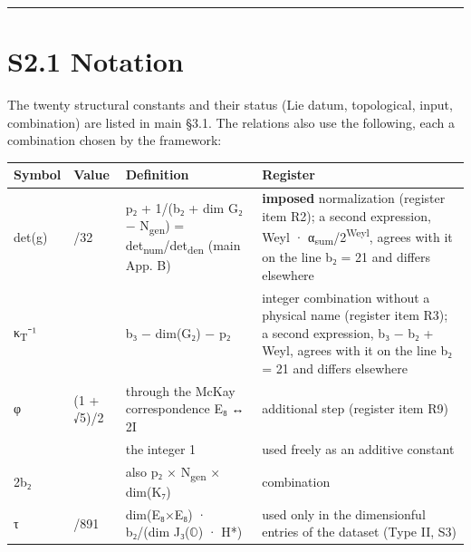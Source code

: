 \documentclass[11pt,a4paper]{article}
\begin{document}
\begin{center}\rule{\linewidth}{0.5pt}\end{center}

\section{S2.1 Notation}\label{s2.1-notation}

The twenty structural constants and their status (Lie datum, topological, input, combination) are listed in main §3.1. The relations also use the following, each a combination chosen by the framework:

\begin{longtable}[]{@{}
  >{\raggedright\arraybackslash}p{}
  >{\raggedright\arraybackslash}p{}
  >{\raggedright\arraybackslash}p{}
  >{\raggedright\arraybackslash}p{}@{}}
\toprule\noalign{}
\begin{minipage}[b]{\linewidth}\raggedright
Symbol
\end{minipage} & \begin{minipage}[b]{\linewidth}\raggedright
Value
\end{minipage} & \begin{minipage}[b]{\linewidth}\raggedright
Definition
\end{minipage} & \begin{minipage}[b]{\linewidth}\raggedright
Register
\end{minipage} \\
\midrule\noalign{}
\endhead
\bottomrule\noalign{}
\endlastfoot
det(g) & 65/32 & p₂ + 1/(b₂ + dim G₂ − N\textsubscript{gen}) = det\textsubscript{num}/det\textsubscript{den} (main App. B) & \textbf{imposed} normalization (register item R2); a second expression, Weyl · α\textsubscript{sum}/2\textsuperscript{Weyl}, agrees with it on the line b₂ = 21 and differs elsewhere \\
κ\textsubscript{T}⁻¹ & 61 & b₃ − dim(G₂) − p₂ & integer combination without a physical name (register item R3); a second expression, b₃ − b₂ + Weyl, agrees with it on the line b₂ = 21 and differs elsewhere \\
φ & (1 + √5)/2 & through the McKay correspondence E₈ ↔ 2I & additional step (register item R9) \\
1 & 1 & the integer 1 & used freely as an additive constant \\
2b₂ & 42 & also p₂ × N\textsubscript{gen} × dim(K₇) & combination \\
τ & 3472/891 & dim(E₈×E₈) · b₂/(dim J₃(\ensuremath{\mathbb{O}}) · H*) & used only in the dimensionful entries of the dataset (Type II, S3) \\
\end{longtable}
\end{document}
